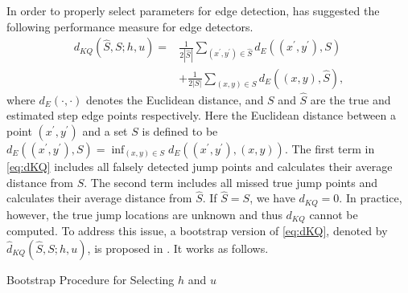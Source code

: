 In order to properly select parameters for edge detection, \citet{kang2014jump} has suggested the following performance measure for edge detectors.
\begin{align}
  d_{KQ}(\widehat{S}, S; h, u) =& \frac{1}{2| \widehat{S} |} \sum_{(x^\prime, y^\prime) \in \widehat{S}} d_E\left((x^\prime, y^\prime), S \right) \nonumber \\
  &+ \frac{1}{2\left| S  \right|} \sum_{(x, y) \in S} d_E\left((x, y), \widehat{S} \right), \label{eq:dKQ}
\end{align}
where \(d_E(\cdot, \cdot)\) denotes the Euclidean distance, and \(S\) and \(\widehat{S}\) are the true and estimated step edge points respectively. Here the Euclidean distance between a point \((x^\prime, y^\prime)\) and a set \(S\) is defined to be \(d_E((x^\prime, y^\prime), S) = \inf_{(x, y) \in S} d_E((x^\prime, y^\prime), (x, y))\). The first term in \eqref{eq:dKQ} includes all falsely detected jump points and calculates their average distance from \(S\). The second term includes all missed true jump points and calculates their average distance from \(\widehat{S}\). If \(\widehat{S} = S\), we have \(d_{KQ} = 0\). In practice, however, the true jump locations are unknown and thus \(d_{KQ}\) cannot be computed. To address this issue, a bootstrap version of \eqref{eq:dKQ}, denoted by \(\widehat{d}_{KQ}(\widehat{S}, S; h, u)\), is proposed in \citet{kang2014jump}. It works as follows.

Bootstrap Procedure for Selecting \(h\) and \(u\)

